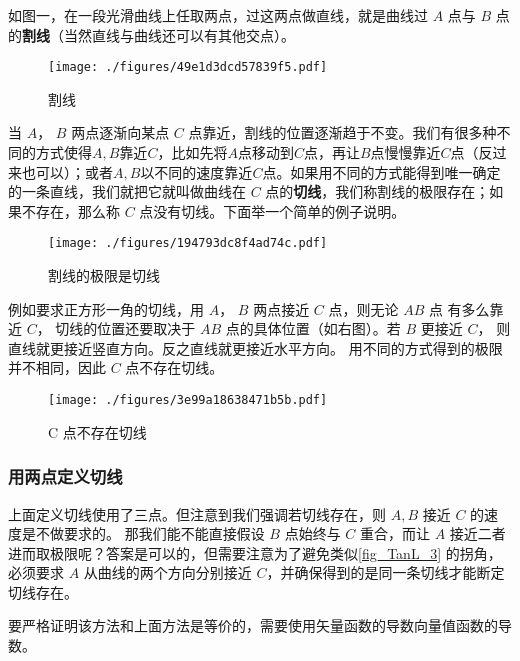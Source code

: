 


如图一，在一段光滑曲线上任取两点，过这两点做直线，就是曲线过 $A$ 点与 $B$ 点的\textbf{割线}（当然直线与曲线还可以有其他交点）。
\begin{figure}[ht]
\centering
\texttt{[image: ./figures/49e1d3dcd57839f5.pdf]}
\caption{割线} \label{fig_TanL_1}
\end{figure}

当 $A$，  $B$ 两点逐渐向某点 $C$ 点靠近，割线的位置逐渐趋于不变。我们有很多种不同的方式使得$A, B$靠近$C$，比如先将$A$点移动到$C$点，再让$B$点慢慢靠近$C$点（反过来也可以）；或者$A, B$以不同的速度靠近$C$点。如果用不同的方式能得到唯一确定的一条直线，我们就把它就叫做曲线在 $C$ 点的\textbf{切线}，我们称割线的极限存在；如果不存在，那么称 $C$ 点没有切线。下面举一个简单的例子说明。

\begin{figure}[ht]
\vskip 0pt
\centering
\texttt{[image: ./figures/194793dc8f4ad74c.pdf]}
\caption{割线的极限是切线} \label{fig_TanL_2}
\end{figure}
例如要求正方形一角的切线，用
 $A$，  $B$ 两点接近 $C$ 点，则无论 $AB$ 点
有多么靠近 $C$， 切线的位置还要取决于 $AB$ 点的具体位置（如右图）。若 $B$ 更接近 $C$， 则直线就更接近竖直方向。反之直线就更接近水平方向。 用不同的方式得到的极限并不相同，因此 $C$ 点不存在切线。

\begin{figure}[ht]
\centering
\texttt{[image: ./figures/3e99a18638471b5b.pdf]}
\caption{C 点不存在切线} \label{fig_TanL_3}
\end{figure}

\subsubsection{用两点定义切线}
上面定义切线使用了三点。但注意到我们强调若切线存在，则 $A,B$ 接近 $C$ 的速度是不做要求的。 那我们能不能直接假设 $B$ 点始终与 $C$ 重合，而让 $A$ 接近二者进而取极限呢？答案是可以的，但需要注意为了避免类似\autoref{fig_TanL_3} 的拐角，必须要求 $A$ 从曲线的两个方向分别接近 $C$，并确保得到的是同一条切线才能断定切线存在。

要严格证明该方法和上面方法是等价的，需要使用矢量函数的导数向量值函数的导数。
